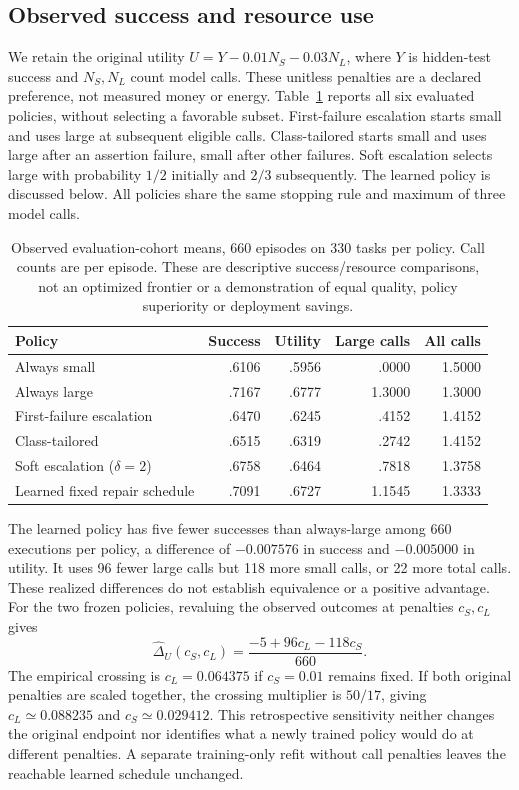 \subsection{Observed success and resource use}
We retain the original utility $U=Y-0.01N_S-0.03N_L$, where $Y$ is hidden-test success and $N_S,N_L$ count model
calls. These unitless penalties are a declared preference, not measured money or energy. Table~\ref{tab:coding-live}
reports all six evaluated policies, without selecting a favorable subset. First-failure escalation starts small
and uses large at subsequent eligible calls. Class-tailored starts small and uses large after an assertion failure,
small after other failures. Soft escalation selects large with probability $1/2$ initially and $2/3$ subsequently. The learned
policy is discussed below. All policies share the same stopping rule and maximum of three model calls.

\begin{table}[htbp]
\centering
\small
\begin{tabular}{lrrrr}
\toprule
Policy & Success & Utility & Large calls & All calls \\
\midrule
Always small & .6106 & .5956 & .0000 & 1.5000 \\
Always large & .7167 & .6777 & 1.3000 & 1.3000 \\
First-failure escalation & .6470 & .6245 & .4152 & 1.4152 \\
Class-tailored & .6515 & .6319 & .2742 & 1.4152 \\
Soft escalation ($\delta=2$) & .6758 & .6464 & .7818 & 1.3758 \\
Learned fixed repair schedule & .7091 & .6727 & 1.1545 & 1.3333 \\
\bottomrule
\end{tabular}
\caption{Observed evaluation-cohort means, 660 episodes on 330 tasks per policy. Call counts are per episode.
These are descriptive success/resource comparisons, not an optimized frontier or a demonstration of equal quality,
policy superiority or deployment savings.}
\label{tab:coding-live}
\end{table}

The learned policy has five fewer successes than always-large among 660 executions per policy, a difference of
$-0.007576$ in success and $-0.005000$ in utility. It uses 96 fewer large calls but 118 more small calls,
or 22 more total calls. These realized differences do not establish equivalence or a positive advantage.
For the two frozen policies, revaluing the observed outcomes at penalties $c_S,c_L$ gives
\[
\widehat\Delta_U(c_S,c_L)=\frac{-5+96c_L-118c_S}{660}.
\]
The empirical crossing is $c_L=0.064375$ if $c_S=0.01$ remains fixed. If both original penalties are scaled
together, the crossing multiplier is $50/17$, giving $c_L\simeq0.088235$ and $c_S\simeq0.029412$.
This retrospective sensitivity neither changes the original endpoint nor identifies what a newly trained policy
would do at different penalties. A separate training-only refit without call penalties leaves the reachable
learned schedule unchanged.

